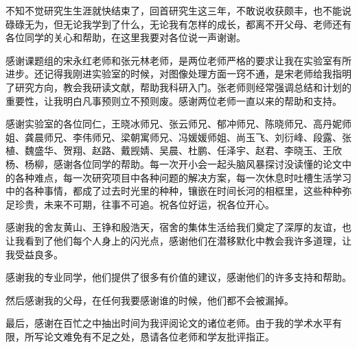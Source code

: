 ﻿%
%
%
%
%
%
不知不觉研究生生涯就快结束了，回首研究生这三年，不敢说收获颇丰，也不能说碌碌无为，但无论我学到了什么，无论我有怎样的成长，都离不开父母、老师还有各位同学的关心和帮助，在这里我要对各位说一声谢谢。

感谢课题组的宋永红老师和张元林老师，是两位老师严格的要求让我在实验室有所进步。还记得我刚进实验室的时候，对图像处理方面一窍不通，是宋老师给我指明了研究方向，教会我研读文献，帮助我科研入门。张老师则经常强调总结和计划的重要性，让我明白凡事预则立不预则废。感谢两位老师一直以来的帮助和支持。

感谢实验室的各位同仁，王晓冰师兄、张云师兄、郁冲师兄、陈晓师兄、高丹妮师姐、龚晨师兄、李伟师兄、梁朝寓师兄、冯媛媛师姐、尚玉飞、刘衍峰、段露、张植、魏盛华、贺翔、赵路、戴觊婧、吴晨、杜鹏、任泽宇、赵君、李晓玉、王欣杨、杨柳，感谢各位同学的帮助。每一次开小会一起头脑风暴探讨没读懂的论文中的各种难点，每一次研究项目中各种问题的解决方案，每一次休息时吐槽生活学习中的各种事情，都成了过去时光里的种种，镶嵌在时间长河的相框里，这些种种弥足珍贵，未来不可期，往事不可追。祝各位好运，祝各位开心。

感谢我的舍友黄山、王铮和殷浩天，宿舍的集体生活给我们奠定了深厚的友谊，也让我看到了他们每个人身上的闪光点，感谢他们在潜移默化中教会我许多道理，让我受益良多。

感谢我的专业同学，他们提供了很多有价值的建议，感谢他们的许多支持和帮助。

然后感谢我的父母，在任何我要感谢谁的时候，他们都不会被漏掉。

最后，感谢在百忙之中抽出时间为我评阅论文的诸位老师。由于我的学术水平有限，所写论文难免有不足之处，恳请各位老师和学友批评指正。

